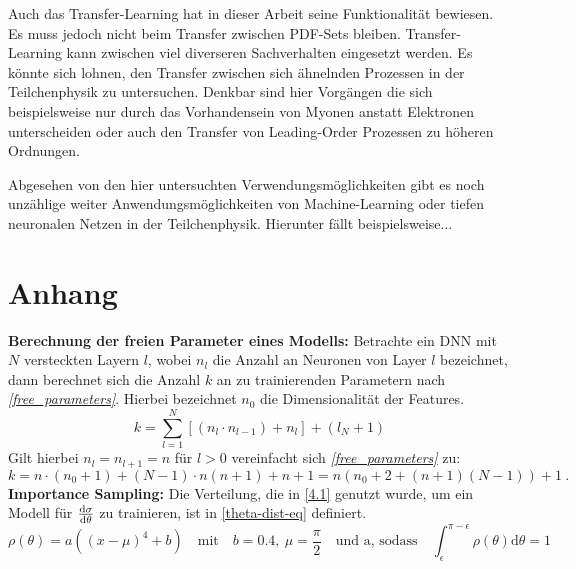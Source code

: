 Auch das Transfer-Learning hat in dieser Arbeit seine Funktionalität bewiesen. Es muss jedoch nicht beim Transfer zwischen PDF-Sets bleiben. Transfer-Learning kann zwischen viel diverseren Sachverhalten eingesetzt werden. Es könnte sich lohnen, den Transfer zwischen sich ähnelnden Prozessen in der Teilchenphysik zu untersuchen. Denkbar sind hier Vorgängen die sich beispielsweise nur durch das Vorhandensein von Myonen anstatt Elektronen unterscheiden oder auch den Transfer von Leading-Order Prozessen zu höheren Ordnungen. 

Abgesehen von den hier untersuchten Verwendungsmöglichkeiten gibt es noch unzählige weiter Anwendungsmöglichkeiten von Machine-Learning oder tiefen neuronalen Netzen in der Teilchenphysik. Hierunter fällt beispielsweise... 
\appendix
\chapter{Anhang}
\textbf{Berechnung der freien Parameter eines Modells:} \label{freie parameter} Betrachte ein DNN mit $N$ versteckten Layern $l$, wobei $n_l$ die Anzahl an Neuronen von Layer $l$ bezeichnet, dann berechnet sich die Anzahl $k$ an zu trainierenden Parametern nach \textit{\autoref{free_parameters}}. Hierbei bezeichnet $n_0$ die Dimensionalität der Features.
\begin{equation}
	k = \sum_{l=1}^{N} \left[(n_l \cdot n_{l-1}) + n_l\right] + (l_N + 1)
	\label{free_parameters}
\end{equation}
Gilt hierbei $n_l = n_{l+1} = n$ für $l > 0$ vereinfacht sich \textit{\autoref{free_parameters}} zu:
\begin{equation}
	k = n \cdot (n_0 + 1) + (N-1)\cdot n(n+1) + n + 1 = n \left(n_0 + 2 + (n + 1)(N-1)\right) + 1~.
\end{equation}
\textbf{Importance Sampling:} Die Verteilung, die in \textsf{\autoref{4.1}} genutzt wurde, um ein Modell für $\derivative{\sigma}{\theta}$ zu trainieren, ist in \textsf{\autoref{theta-dist-eq}} definiert.
\begin{equation}
	\label{theta-dist-eq}
	\rho(\theta) = a((x-\mu)^4 + b) \quad \text{mit} \quad b=0.4,~ \mu = \frac{\pi}{2} \quad \text{und a, sodass} \quad \int_{\epsilon}^{\pi - \epsilon} \rho(\theta) \text{d}\theta = 1
\end{equation}

